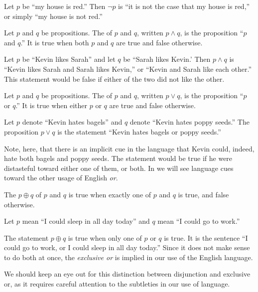 \begin{ex}
Let $p$ be ``my house is red.''
Then $\neg p$ is
``it is not the case that my house is red,''
or simply
``my house is not red.''
\end{ex}

Let \(p\) and \(q\) be propositions.
The  of \(p\) and \(q\),
written
$p \wedge q$,
is the proposition
``\(p\) and \(q\).''
It is true when both \(p\) and \(q\) are true and false otherwise.

\begin{ex}
Let $p$ be ``Kevin likes Sarah'' and let $q$ be ``Sarah likes Kevin.'
Then $p \wedge q$ is ``Kevin likes Sarah and Sarah likes Kevin,'' or ``Kevin and Sarah like each other.''
This statement would be false if either of the two did not like the other.
\end{ex}

Let \(p\) and \(q\) be propositions.
The 
of \(p\) and \(q\),
written $p \vee q$,
is the proposition
``\(p\) or \(q\).''
It is true when either \(p\) or \(q\) are true and false otherwise.

\begin{ex}
Let $p$ denote ``Kevin hates bagels'' and $q$ denote ``Kevin hates poppy seeds.''
The proposition $p \vee q$ is the statement ``Kevin hates bagels or poppy seeds.''

\begin{remark}
Note, here, that there is an implicit cue in the language that Kevin could,
indeed, hate both bagels and poppy seeds.
The statement would be true if he were distasteful toward either one of them,
or both. In  we will see language cues toward the
other usage of English \emph{or}.
\end{remark}
\end{ex}

\begin{defn}[exclusive or]
The 
$p \oplus q$
of $p$ and $q$ is true when exactly one of $p$ and $q$ is true,
and false otherwise.
\end{defn}

\begin{ex}\label{ex:prop:xordefn}
Let $p$ mean ``I could sleep in all day today'' and $q$ mean ``I could go to work.''

The statement $p \oplus q$ is true when only one of $p$ or $q$ is true.
It is the sentence ``I could go to work, or I could sleep in all day today.''
Since it does not make sense to do both at once, the \emph{exclusive or} is
implied in our use of the English language.

\begin{remark}
  We should keep an eye out for this distinction between disjunction and
  exclusive or, as it requires careful attention to the subtleties in our use of
  language.
\end{remark}
\end{ex}

